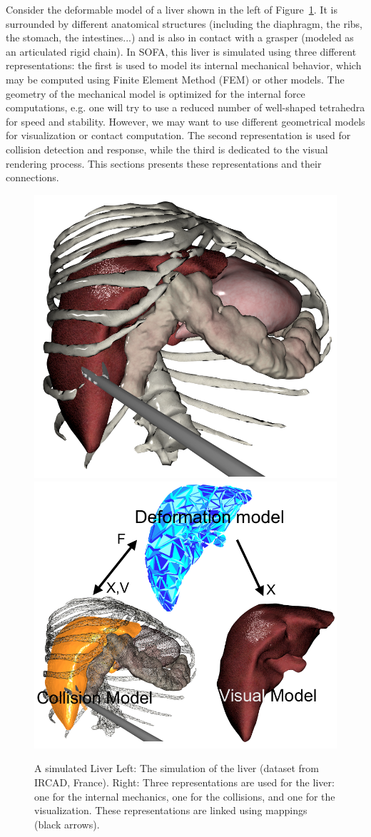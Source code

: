 Consider the deformable model of a liver shown in the left of Figure~\ref{fig:liver-multimodel}.
It is surrounded by different anatomical structures (including the diaphragm, the ribs, the stomach, the intestines...) and is also in contact with a grasper (modeled as an articulated rigid chain).
In SOFA, this liver is simulated using three different representations: the first is used to model its internal mechanical behavior, which may be computed using Finite Element Method (FEM) or other models.
The geometry of the mechanical model is optimized for the internal force computations, e.g. one will try to use a reduced number of well-shaped tetrahedra for speed and stability.
However, we may want to use different geometrical models for visualization or contact computation.
The second representation is used for collision detection and response, while the third is dedicated to the visual rendering process.
This sections presents these representations and their connections.

\begin{figure}
 \centering
 \includegraphics[width=0.48\linewidth]{NewLiver.png}
 \includegraphics[width=0.5\linewidth]{NewLiverMap.png}
 \caption{A simulated Liver
Left: The simulation of the liver (dataset from IRCAD, France). Right: Three representations are used for the liver: one for the internal mechanics, one for the collisions, and one for the visualization.  These representations are linked using mappings (black arrows).}
 \label{fig:liver-multimodel}
\end{figure}

